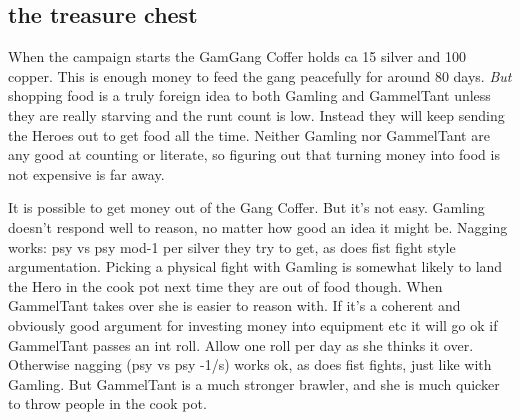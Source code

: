 %

%

%


\subsection*{the treasure chest}

When the campaign starts the GamGang Coffer holds ca 15 silver and 100 copper. This is enough money to feed the gang peacefully for around 80 days. \emph{But} shopping food is a truly foreign idea to both Gamling and GammelTant unless they are really starving and the runt count is low. Instead they will keep sending the Heroes out to get food all the time. Neither Gamling nor GammelTant are any good at counting or literate, so figuring out that turning money into food is not expensive is far away.

It is possible to get money out of the Gang Coffer. But it's not easy. Gamling doesn't respond well to reason, no matter how good an idea it might be. Nagging works: psy vs psy mod-1 per silver they try to get, as does fist fight style argumentation. Picking a physical fight with Gamling is somewhat likely to land the Hero in the cook pot next time they are out of food though. When GammelTant takes over she is easier to reason with. If it's a coherent and obviously good argument for investing money into equipment etc it will go ok if GammelTant passes an int roll. Allow one roll per day as she thinks it over. Otherwise nagging (psy vs psy -1/s) works ok, as does fist fights, just like with Gamling. But GammelTant is a much stronger brawler, and she is much quicker to throw people in the cook pot.

